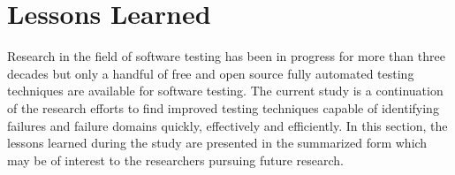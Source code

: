 




\section{Lessons Learned}
Research in the field of software testing has been in progress for more than three decades but only a handful of free and open source fully automated testing techniques are available for software testing. The current study is a continuation of the research efforts to find improved testing techniques capable of identifying failures and failure domains quickly, effectively and efficiently. In this section, the lessons learned during the study are presented in the summarized form which may be of interest to the researchers pursuing future research.


